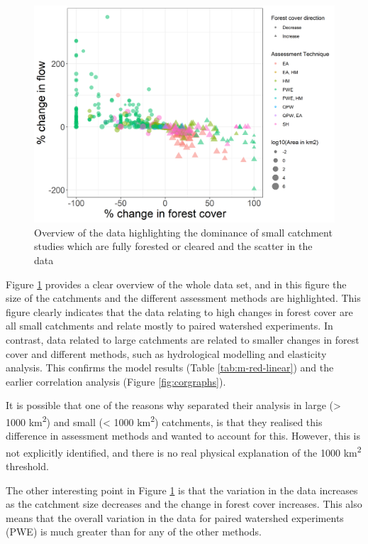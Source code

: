 \documentclass[]{elsarticle} %
\begin{document}
\begin{figure}
\includegraphics[width=0.9\linewidth]{flow_forest_byArea} \caption{Overview of the data highlighting the dominance of small catchment studies which are fully forested or cleared and the scatter in the data}\label{fig:overview}
\end{figure}

Figure \ref{fig:overview} provides a clear overview of the whole data set, and in this figure the size of the catchments and the different assessment methods are highlighted. This figure clearly indicates that the data relating to high changes in forest cover are all small catchments and relate mostly to paired watershed experiments. In contrast, data related to large catchments are related to smaller changes in forest cover and different methods, such as hydrological modelling and elasticity analysis. This confirms the model results (Table \ref{tab:m-red-linear}) and the earlier correlation analysis (Figure \ref{fig:corgraphs}).

It is possible that one of the reasons why \citet{zhang2017} separated their analysis in large (\textgreater{} 1000 km\textsuperscript{2}) and small (\textless{} 1000 km\textsuperscript{2}) catchments, is that they realised this difference in assessment methods and wanted to account for this. However, this is not explicitly identified, and there is no real physical explanation of the 1000 km\textsuperscript{2} threshold.

The other interesting point in Figure \ref{fig:overview} is that the variation in the data increases as the catchment size decreases and the change in forest cover increases. This also means that the overall variation in the data for paired watershed experiments (PWE) is much greater than for any of the other methods.
\end{document}
